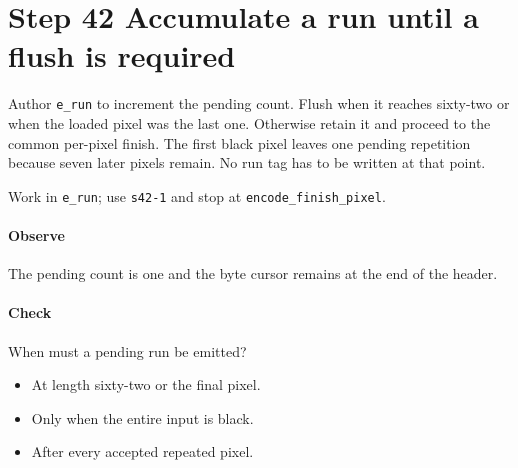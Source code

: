 \section{Step 42 Accumulate a run until a flush is required}\label{qoi-s42}
Author \texttt{e\_run} to increment the pending count. Flush when it reaches sixty-two or when the loaded pixel was the last one. Otherwise retain it and proceed to the common per-pixel finish. The first black pixel leaves one pending repetition because seven later pixels remain. No run tag has to be written at that point.

Work in \texttt{e\_run}; use \texttt{s42-1} and stop at \texttt{encode\_finish\_pixel}.

\paragraph{Observe} The pending count is one and the byte cursor remains at the end of the header.

\paragraph{Check} When must a pending run be emitted?
\begin{itemize}
\item[A.] At length sixty-two or the final pixel.
\item[B.] Only when the entire input is black.
\item[C.] After every accepted repeated pixel.
\end{itemize}
